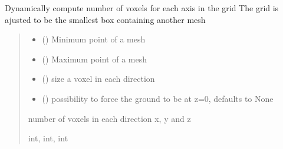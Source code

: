 \documentclass[letterpaper,10pt,english]{sphinxmanual}
\begin{document}
\begin{fulllineitems}
\label{\detokenize{reference:voxelsmesh.compute_grid_size_from_trimesh}}
\pysigstartsignatures
{}
\pysigstopsignatures
\sphinxAtStartPar
Dynamically compute number of voxels for each axis in the grid
The grid is ajusted to be the smallest box containing another mesh
\begin{quote}\begin{description}
\begin{itemize}
\item {} 
\sphinxAtStartPar
{} () \textendash{} Minimum point of a mesh \sphinxcode{\sphinxupquote{{[}x, y, z{]}}}

\item {} 
\sphinxAtStartPar
{} () \textendash{} Maximum point of a mesh \sphinxcode{\sphinxupquote{{[}x, y, z{]}}}

\item {} 
\sphinxAtStartPar
{} () \textendash{} size a voxel in each direction \sphinxcode{\sphinxupquote{{[}dx, dy, dz{]}}}

\item {} 
\sphinxAtStartPar
{} (\sphinxstyleliteralemphasis{\sphinxupquote{, }}) \textendash{} possibility to force the ground to be at z=0, defaults to None

\end{itemize}

\sphinxAtStartPar
number of voxels in each direction x, y and z

\sphinxAtStartPar
int, int, int

\end{description}\end{quote}

\end{fulllineitems}
\end{document}
